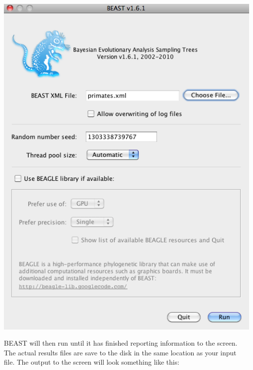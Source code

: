 \documentclass[12pt]{article}
\begin{document}
\includegraphics[scale=0.5]{figures/BEAST}

\medskip{}

BEAST will then run until it has finished
reporting information to the screen. The actual results files are
save to the disk in the same location as your input file. The output to the screen will
look something like this: 
\end{document}
